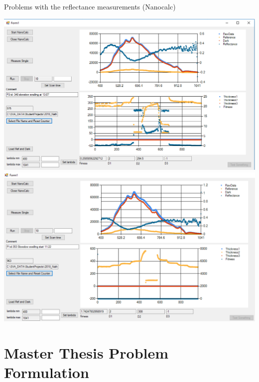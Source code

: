 \documentclass[10pt]{beamer}
\begin{document}
\begin{frame}{Problems with the reflectance measurements (Nanocalc)}

\centering
\includegraphics[height=0.35\textheight]{badmeasure2.png}
\includegraphics[height=0.35\textheight]{badmeasure3.png}


\end{frame}


	\section{Master Thesis Problem Formulation}
\end{document}
